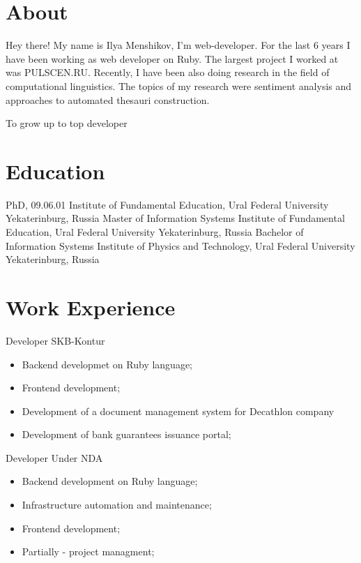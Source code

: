 \documentclass[11pt,a4paper]{moderncv}
\begin{document}
\maketitle

\section{About}
 {
  Hey there! My name is Ilya Menshikov, I'm web-developer.
}
\cvitem{} {
  For the last 6 years I have been working as web developer on Ruby. The largest project I worked at was PULSCEN.RU.
}
\cvitem{} {
  Recently, I have been also doing research in the field of computational linguistics. The topics of my research were sentiment analysis and approaches to automated thesauri construction.
}

 {
  To grow up to top developer
}


\section{Education}

  {PhD, 09.06.01}
  {Institute of Fundamental Education, Ural Federal University}
  {Yekaterinburg, Russia}
{}{}
  {Master of Information Systems}
  {Institute of Fundamental Education, Ural Federal University}
  {Yekaterinburg, Russia}
{}{}
  {Bachelor of Information Systems}
  {Institute of Physics and Technology, Ural Federal University}
  {Yekaterinburg, Russia}
{}{}

\section{Work Experience}

  {Developer}{}
  {SKB-Kontur}
  {}
{
\begin{itemize}
  \item Backend developmet on Ruby language;
  \item Frontend development;
  \item Development of a document management system for Decathlon company
  \item Development of bank guarantees issuance portal;
\end{itemize}
}

  {Developer}{}
  {Under NDA}
  {}
{
\begin{itemize}
  \item Backend development on Ruby language;
  \item Infrastructure automation and maintenance;
  \item Frontend development;
  \item Partially - project managment;
\end{itemize}
}
\end{document}
